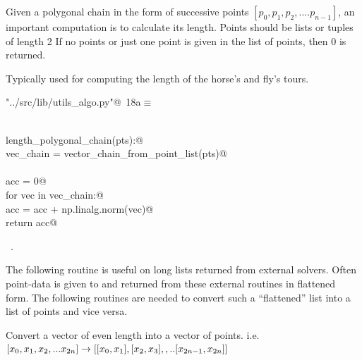 \documentclass[11.5pt]{report}
\begin{document}
\newchunk Given a polygonal chain in the form of successive points  $[p_0,p_1,p_2,....p_{n-1}]$, 
an important computation is to calculate its length. Points should be lists or tuples of length 2
If no points or just one point is given in the list of points, then 0 is returned.

Typically used for computing the length of the horse's and fly's tours. 

\begin{flushleft} \small\label{scrap13}\raggedright\small
{} \verb@"../src/lib/utils_algo.py"@\nobreak\ {\footnotesize {18a}}$\equiv$
\vspace{-1ex}
\begin{list}{}{} \item
\mbox{}\verb@@\\
\mbox{}\verb@def length_polygonal_chain(pts):@\\
\mbox{}\verb@    vec_chain = vector_chain_from_point_list(pts)@\\
\mbox{}\verb@@\\
\mbox{}\verb@    acc = 0@\\
\mbox{}\verb@    for vec in vec_chain:@\\
\mbox{}\verb@        acc = acc + np.linalg.norm(vec)@\\
\mbox{}\verb@    return acc@\\
\mbox{}\verb@@{\NWsep}
\end{list}
\vspace{-1.5ex}
\footnotesize
\begin{list}{}{\setlength{\itemsep}{-\parsep}\setlength{\itemindent}{-\leftmargin}}
\item \NWtxtFileDefBy\ .

\item{}
\end{list}
\vspace{4ex}
\end{flushleft}
\newchunk The following routine is useful on long lists returned from external solvers. 
Often point-data is given to and returned from these external routines in flattened
form. The following routines are needed to convert such a ``flattened'' list into 
a list of points and vice versa. 

Convert a vector of even length into a vector of points. i.e. 
$[x_0,x_1,x_2,...x_{2n}] \rightarrow [[x_0,x_1],[x_2,x_3],,..[x_{2n-1},x_{2n}]]$
\end{document}
